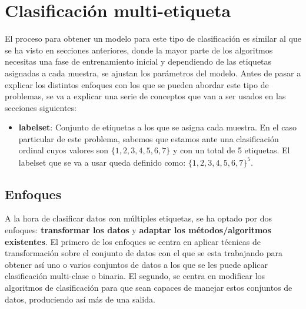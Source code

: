 \chapter{Clasificación multi-etiqueta}
El proceso para obtener un modelo para este tipo de clasificación es similar al que se ha visto en secciones anteriores, donde la mayor parte de los algoritmos necesitas una fase de entrenamiento inicial y dependiendo de las etiquetas asignadas a cada muestra, se ajustan los parámetros del modelo.
\linebreak
Antes de pasar a explicar los distintos enfoques con los que se pueden abordar este tipo de problemas, se va a explicar una serie de conceptos que van a ser usados en las secciones siguientes:
\begin{itemize}
	\item \textbf{labelset}: Conjunto de etiquetas a los que se asigna cada muestra. En el caso particular de este problema, sabemos que estamos ante una clasificación ordinal cuyos valores son $\{1,2,3,4,5,6,7\}$ y con un total de 5 etiquetas. El labelset que se va a usar queda definido como: $\{1,2,3,4,5,6,7\}^5$.
\end{itemize}
\section{Enfoques}
A la hora de clasificar datos con múltiples etiquetas, se ha optado por dos enfoques: \textbf{transformar los datos} y \textbf{adaptar los métodos/algoritmos existentes}. \linebreak
El primero de los enfoques se centra en aplicar técnicas de transformación sobre el conjunto de datos con el que se esta trabajando para obtener así uno o varios conjuntos de datos a los que se les puede aplicar clasificación multi-clase o binaria. \linebreak
El segundo, se centra en modificar los algoritmos de clasificación para que sean capaces de manejar estos conjuntos de datos, produciendo así más de una salida.
